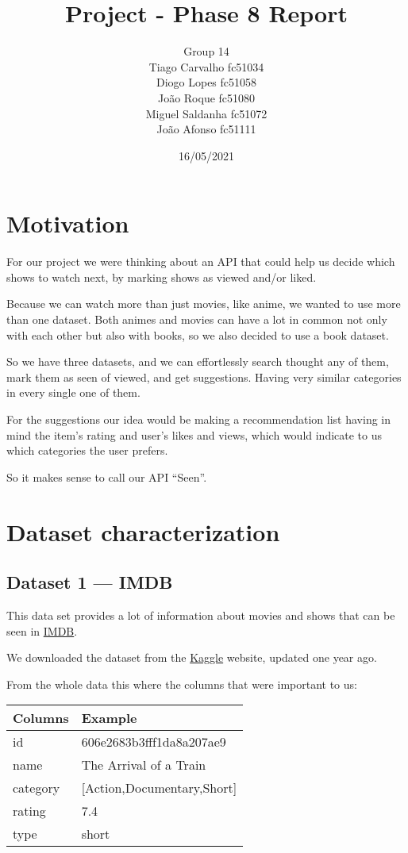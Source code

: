 \documentclass{article}
\title{Project - Phase 8 Report}
\author{Group 14 \\
Tiago Carvalho fc51034 \\
Diogo Lopes fc51058 \\
João Roque fc51080 \\
Miguel Saldanha fc51072 \\
João Afonso fc51111 \\
}
\date{16/05/2021}
\newcommand*\fpar{\hspace{1ex}}
\begin{document}
\maketitle

\section{Motivation}
\label{sec:motivation}
\fpar For our project we were thinking about an API that could help us decide which shows to watch next, by marking shows as viewed and/or liked.
\par Because we can watch more than just movies, like anime, we wanted to use more than one dataset. Both animes and movies can have a lot in common not only with each other but also with books, so we also decided to use a book dataset.
\par So we have three datasets, and we can effortlessly search thought any of them, mark them as seen of viewed, and get suggestions. Having very similar categories in every single one of them.
\par For the suggestions our idea would be making a recommendation list having in mind the item's rating and user's likes and views, which would indicate to us which categories the user prefers.
\par So it makes sense to call our API “Seen”.

\section{Dataset characterization}
\label{sec:dataset}
  \subsection{Dataset 1 — IMDB}
  \label{sec:imdb}
  \fpar This data set provides a lot of information about movies and shows that can be seen in \href{https://www.imdb.com}{IMDB}.
  \par We downloaded the dataset from the \href{https://www.kaggle.com/ashirwadsangwan/imdb-dataset}{Kaggle} website, updated one year ago.
  \par From the whole data this where the columns that were important to us:
  \begin{table}[H]
    \centering
    \begin{tabular}{l|l}
      Columns & Example                     \\ \hline
      id      & 606e2683b3fff1da8a207ae9    \\
      name    & The Arrival of a Train      \\
      category& [Action,Documentary,Short]  \\
      rating  & 7.4                         \\
      type    & short
    \end{tabular}
  \end{table}
\end{document}
